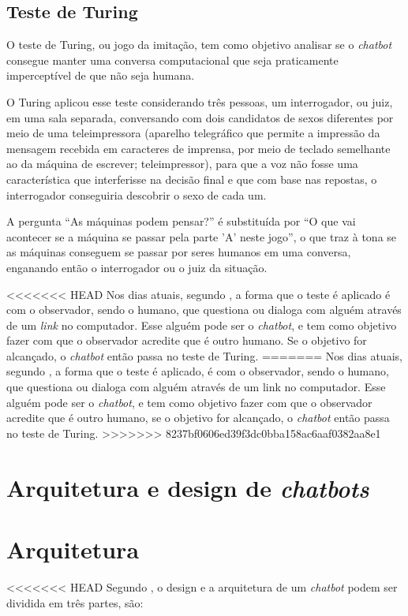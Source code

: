 \documentclass[
	12pt,				%
	oneside,
	a4paper,			%
	english,			%
	french,				%
	spanish,			%
	brazil				%
	]{abntex2}
\begin{document}
\subsection{Teste de Turing}
O teste de Turing, ou jogo da imitação, tem como objetivo analisar se o \emph{chatbot} consegue manter uma conversa computacional que seja praticamente imperceptível de que não seja humana.

O Turing aplicou esse teste considerando três pessoas, um interrogador, ou juiz, em uma sala separada, conversando com dois candidatos de sexos diferentes por meio de uma teleimpressora (aparelho telegráfico que permite a impressão da mensagem recebida em caracteres de imprensa, por meio de teclado semelhante ao da máquina de escrever; teleimpressor), para que a voz não fosse uma característica que interferisse na decisão final e que com base nas repostas, o interrogador conseguiria descobrir o sexo de cada um.

A pergunta “As máquinas podem pensar?” é substituída por “O que vai acontecer se a máquina se passar pela parte 'A' neste jogo”, o que traz à tona se as máquinas conseguem se passar por seres humanos em uma conversa, enganando então o interrogador ou o juiz da situação.\cite{Turing}

<<<<<<< HEAD
Nos dias atuais, segundo \textcite{LukaBradesko}, a forma que o teste é aplicado é com o observador, sendo o humano, que questiona ou dialoga com alguém através de um \emph{link} no computador. Esse alguém pode ser o \emph{chatbot}, e tem como objetivo fazer com que o observador acredite que é outro humano. Se o objetivo for alcançado, o \emph{chatbot} então passa no teste de Turing.
=======
Nos dias atuais, segundo \textcite{LukaBradesko}, a forma que o teste é aplicado, é com o observador, sendo o humano, que questiona ou dialoga com alguém através de um link no computador. Esse alguém pode ser o \emph{chatbot}, e tem como objetivo fazer com que o observador acredite que é outro humano, se o objetivo for alcançado, o \emph{chatbot} então passa no teste de Turing.
>>>>>>> 8237bf0606ed39f3dc0bba158ac6aaf0382aa8e1


\section{Arquitetura e design de \emph{chatbots}}
\section{Arquitetura}
<<<<<<< HEAD
Segundo \textcite{Abdul-Kader2015}, o design e a arquitetura de um \emph{chatbot} podem ser dividida em três partes, são:
\end{document}
